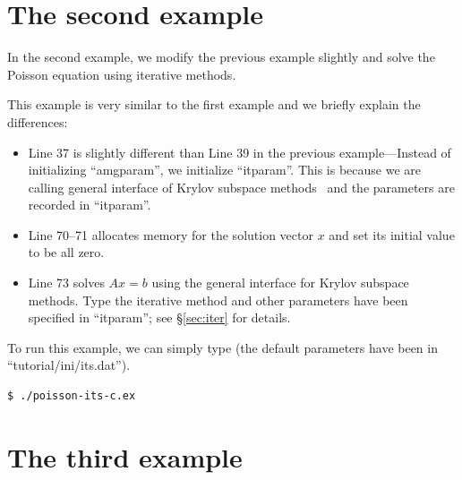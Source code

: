 \documentclass[11pt]{memoir}
\begin{document}
\section{The second example}\label{sec:ex2}

In the second example, we modify the previous example slightly and solve the Poisson equation using iterative methods.
%

%
This example is very similar to the first example and we briefly explain the differences:
\begin{itemize}
%
\item Line 37 is slightly different than Line 39 in the previous example---Instead of initializing ``amgparam'', we initialize ``itparam''. This is because we are calling general interface of Krylov subspace methods~\cite{Saad.Saad.2003fv} and the parameters are recorded in ``itparam''.
%
\item Line 70--71 allocates memory for the solution vector $x$ and set its initial value to be all zero.
%
\item Line 73 solves $Ax=b$ using the general interface for Krylov subspace methods. Type the iterative method and other parameters have been specified in ``itparam''; see \S\ref{sec:iter} for details.
%
\end{itemize}
%
To run this example, we can simply type (the default parameters have been in ``tutorial/ini/its.dat'').
%
\begin{lstlisting}[numbers=none]
$ ./poisson-its-c.ex
\end{lstlisting}

\section{The third example}\label{sec:ex3}
\end{document}
